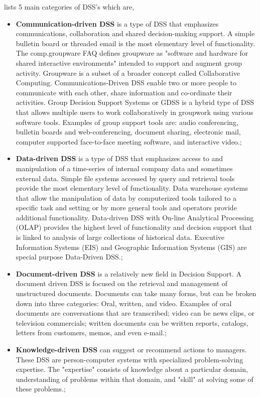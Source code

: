 \documentclass[12pt, oneside]{report}
\begin{document}
\citep{Power2003} lists 5 main categories of DSS's which are,

\begin {itemize}
\item \textbf{Communication-driven DSS} is a type of DSS that emphasizes communications, collaboration and shared decision-making support. A simple bulletin board or threaded email is the most elementary level of functionality. The comp.groupware FAQ defines groupware as "software and hardware for shared interactive environments" intended to support and augment group activity. Groupware is a subset of a broader concept called Collaborative Computing. Communications-Driven DSS enable two or more people to communicate with each other, share information and co-ordinate their activities. Group Decision Support Systems or GDSS is a hybrid type of DSS that allows multiple users to work collaboratively in groupwork using various software tools. Examples of group support tools are: audio conferencing, bulletin boards and web-conferencing, document sharing, electronic mail, computer supported face-to-face meeting software, and interactive video.; 
\item \textbf{Data-driven DSS} is a type of DSS that emphasizes access to and manipulation of a time-series of internal company data and sometimes external data. Simple file systems accessed by query and retrieval tools provide the most elementary level of functionality. Data warehouse systems that allow the manipulation of data by computerized tools tailored to a specific task and setting or by more general tools and operators provide additional functionality. Data-driven DSS with On-line Analytical Processing (OLAP) provides the highest level of functionality and decision support that is linked to analysis of large collections of historical data. Executive Information Systems (EIS) and Geographic Information Systems (GIS) are special purpose Data-Driven DSS.;
\item \textbf{Document-driven DSS} is a relatively new field in Decision Support. A document driven DSS is focused on the retrieval and management of unstructured documents. Documents can take many forms, but can be broken down into three categories: Oral, written, and video. Examples of oral documents are conversations that are transcribed; video can be news clips, or television commercials; written documents can be written reports, catalogs, letters from customers, memos, and even e-mail.;
\item \textbf{Knowledge-driven DSS} can suggest or recommend actions to managers. These DSS are person-computer systems with specialized problem-solving expertise. The "expertise" consists of knowledge about a particular domain, understanding of problems within that domain, and "skill" at solving some of these problems.;

\end{itemize}
\end{document}
